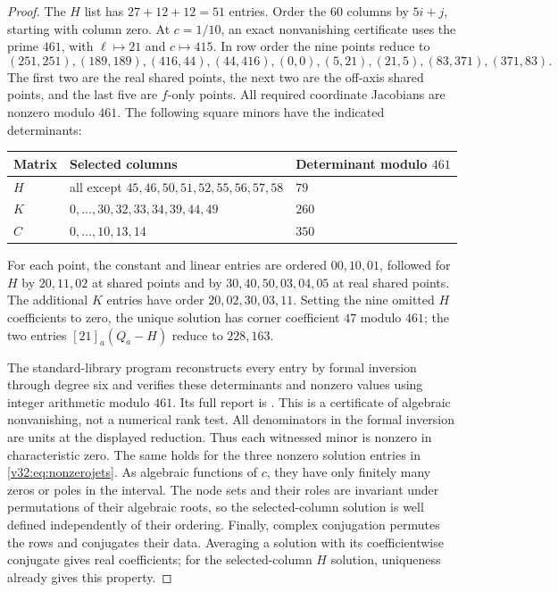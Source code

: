 \documentclass[UTF8,11pt]{ctexart}
\theoremstyle{definition}
\numberwithin{equation}{section}
\begin{document}
\begin{proof}
The $H$ list has $27+12+12=51$ entries. Order the $60$ columns
by $5i+j$, starting with column zero. At $c=1/10$, an exact
nonvanishing certificate uses the prime $461$, with
$\ell\mapsto21$ and $c\mapsto415$. In row order the nine
points reduce to
\[
 (251,251),(189,189),(416,44),(44,416),(0,0),
 (5,21),(21,5),(83,371),(371,83).
\]
The first two are the real shared points, the next two are the
off-axis shared points, and the last five are $f$-only points.
All required coordinate Jacobians are nonzero modulo $461$.
The following square minors have the indicated determinants:
\begin{center}
\begin{tabular}{@{}lll@{}}
\toprule
Matrix & Selected columns & Determinant modulo $461$\\
\midrule
$H$ & all except $45,46,50,51,52,55,56,57,58$ & $79$\\
$K$ & $0,\ldots,30,32,33,34,39,44,49$ & $260$\\
$C$ & $0,\ldots,10,13,14$ & $350$\\
\bottomrule
\end{tabular}
\end{center}
For each point, the constant and linear entries are ordered
$00,10,01$, followed for $H$ by $20,11,02$ at shared points
and by $30,40,50,03,04,05$ at real shared points. The additional
$K$ entries have order $20,02,30,03,11$.
Setting the nine omitted $H$ coefficients to zero, the unique
solution has corner coefficient $47$ modulo $461$; the two
entries $[21]_a(Q_a-H)$ reduce to $228,163$.

The standard-library program 
reconstructs every entry by formal inversion through degree six
and verifies these determinants and nonzero values using integer
arithmetic modulo $461$. Its full report is
. This is a certificate
of algebraic nonvanishing, not a numerical rank test.
All denominators in the formal inversion are units at the
displayed reduction. Thus each witnessed minor is nonzero in
characteristic zero. The same holds for the three nonzero
solution entries in \eqref{v32:eq:nonzerojets}.
As algebraic functions of $c$, they have only finitely many
zeros or poles in the interval. The node sets and their roles
are invariant under permutations of their algebraic roots, so
the selected-column solution is well defined independently of
their ordering. Finally, complex conjugation permutes the rows
and conjugates their data. Averaging a solution with its
coefficientwise conjugate gives real coefficients; for the
selected-column $H$ solution, uniqueness already gives this property.
\end{proof}
\end{document}
